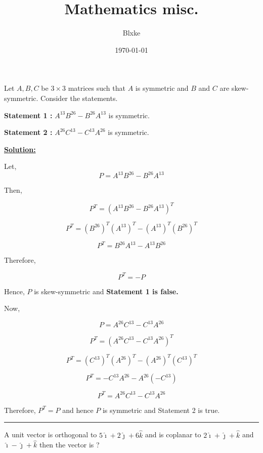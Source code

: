 \documentclass[twocolumn]{article}
\title{\textbf{Mathematics misc.}}
\author{ Blxke }
\date{\today}
\newcommand\bb[1]{\textcolor{yorhafg}{\textbf{#1}}}
\begin{document}
\maketitle    

\begin{question}
    \begin{small}
         Let \(A, B, C\) be \( 3\times 3 \) matrices such that \(A\) is symmetric and \( B\) and \( C\) are skew-symmetric. Consider the statements.

        \bb{Statement 1 : } \(A^{13} B^{26} - B^{26}A^{13}  \) is symmetric. 

        \bb{Statement 2 : } \(A^{26} C^{13}  - C^{13} A^{26}  \) is symmetric.     
    \end{small}
\end{question}


\vspace*{0.5in}

\bb{\underline{Solution: }} 

Let, 
\[
    P = A^{13} B^{26} - B^{26}A^{13}
\]

Then,

\[
     P^T = (A^{13} B^{26} - B^{26}A^{13})^T
\]

\[
    P^T = (B^{26})^T (A^{13})^T - (A^{13})^T (B^{26})^T    
\]

\[
    P^T = B^{26}A^{13} - A^{13} B^{26}  
\]

Therefore, 

\[
    P^T = -P 
\]

Hence, \(P\) is skew-symmetric and \textbf{Statement 1 is false.} 

Now, 

\[
    P = A^{26} C^{13}  - C^{13} A^{26}
\]

\[
    P^T = (A^{26} C^{13}  - C^{13} A^{26})^T
\]

\[
    P^T = (C^{13})^T (A^{26} )^T - (A^{26})^T (C^{13} )^T
\]

\[
    P^T = -C^{13} A^{26} - A^{26} (-C^{13} )
\]

\[
    P^T = A^{26} C^{13}  - C^{13} A^{26}
\]

Therefore, \(P^T = P\) and hence \(P\) is symmetric and Statement 2 is true. 

\vspace*{0.1in}

\hrule

\vspace*{0.1in}

\begin{question}
    A unit vector is orthogonal to \(5 \hat{\imath}  + 2 \hat{\jmath} + 6\hat{k} \)  and is coplanar to \(2 \hat{\imath}  + \hat{\jmath}  + \hat{k} \) and \(\hat{\imath} -\hat{\jmath} +\hat{k} \) then the vector is ?  
\end{question}
\end{document}
